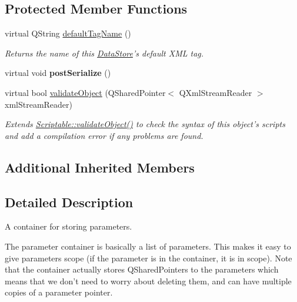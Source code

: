 \subsection*{Protected Member Functions}
\begin{DoxyCompactItemize}
\item 
virtual Q\-String \hyperlink{class_picto_1_1_parameter_container_a7047f2c6753acddf761f1b17b5efb585}{default\-Tag\-Name} ()
\begin{DoxyCompactList}\small\item\em Returns the name of this \hyperlink{class_picto_1_1_data_store}{Data\-Store}'s default X\-M\-L tag. \end{DoxyCompactList}\item 
\hypertarget{class_picto_1_1_parameter_container_af9f8d24df13b769ddd97e2ded198d5f2}{virtual void {\bfseries post\-Serialize} ()}\label{class_picto_1_1_parameter_container_af9f8d24df13b769ddd97e2ded198d5f2}

\item 
\hypertarget{class_picto_1_1_parameter_container_ac6d51674b3c137df04536991b3d08a48}{virtual bool \hyperlink{class_picto_1_1_parameter_container_ac6d51674b3c137df04536991b3d08a48}{validate\-Object} (Q\-Shared\-Pointer$<$ Q\-Xml\-Stream\-Reader $>$ xml\-Stream\-Reader)}\label{class_picto_1_1_parameter_container_ac6d51674b3c137df04536991b3d08a48}

\begin{DoxyCompactList}\small\item\em Extends \hyperlink{class_picto_1_1_scriptable_ab6e2944c43a3b5d418bf7b251594386d}{Scriptable\-::validate\-Object()} to check the syntax of this object's scripts and add a compilation error if any problems are found. \end{DoxyCompactList}\end{DoxyCompactItemize}
\subsection*{Additional Inherited Members}


\subsection{Detailed Description}
A container for storing parameters. 

The parameter container is basically a list of parameters. This makes it easy to give parameters scope (if the parameter is in the container, it is in scope). Note that the container actually stores Q\-Shared\-Pointers to the parameters which means that we don't need to worry about deleting them, and can have multiple copies of a parameter pointer. 

